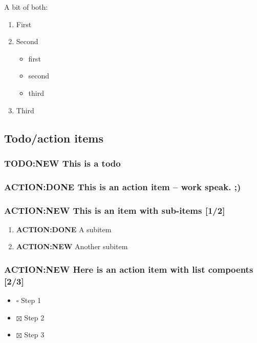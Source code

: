\documentclass[11pt]{article}
\begin{document}
A bit of both:

\begin{enumerate}
\item First
\item Second
\begin{itemize}
\item first
\item second
\item third
\end{itemize}
\item Third
\end{enumerate}

\subsection{Todo/action items}
\label{sec-2-3}

\subsubsection{{\bfseries\sffamily TODO:NEW} This is a todo}
\label{sec-2-3-1}

\subsubsection{{\bfseries\sffamily ACTION:DONE} This is an action item -- work speak. ;)}
\label{sec-2-3-2}

\subsubsection{{\bfseries\sffamily ACTION:NEW} This is an item with sub-items [1/2]}
\label{sec-2-3-3}
\begin{enumerate}
\item {\bfseries\sffamily ACTION:DONE} A subitem
\label{sec-2-3-3-1}
\item {\bfseries\sffamily ACTION:NEW} Another subitem
\label{sec-2-3-3-2}
\end{enumerate}

\subsubsection{{\bfseries\sffamily ACTION:NEW} Here is an action item with list compoents [2/3]}
\label{sec-2-3-4}
\begin{itemize}
\item $\square$ Step 1
\item $\boxtimes$ Step 2
\item $\boxtimes$ Step 3
\end{itemize}
\end{document}

